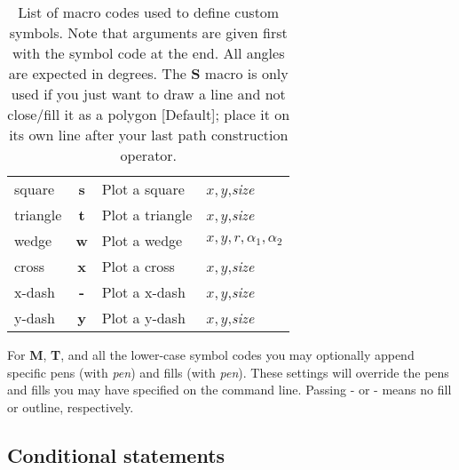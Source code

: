 \begin{table}[H]
\begin{tabular}{lcll}
square		&	\textbf{s}	& Plot a square 			& $x, y$,\emph{size}  \\
triangle	&	\textbf{t}	& Plot a triangle 			& $x, y$,\emph{size}  \\
wedge		&	\textbf{w}	& Plot a wedge 				& $x, y, r, \alpha_1, \alpha_2$  \\
cross		&	\textbf{x}	& Plot a cross 				& $x, y$,\emph{size}  \\
x-dash		&	\textbf{-}	& Plot a x-dash 			& $x, y$,\emph{size}  \\
y-dash		&	\textbf{y}	& Plot a y-dash 			& $x, y$,\emph{size}  \\ \hline
\end{tabular}
\label{tbl:custsymb}
\caption{List of macro codes used to define custom symbols.  Note that arguments are given first with the symbol code at the end.
All angles are expected in degrees. The \textbf{S} macro is only used if you just want to draw a line and not close/fill it as
a polygon [Default]; place it on its own line after your last path construction operator.}
\end{table} 
For \textbf{M}, \textbf{T}, and all the lower-case symbol codes you may optionally append specific pens (with \emph{pen})
and fills (with \emph{pen}).  These settings will override the pens and fills you may have specified
on the command line.  Passing - or - means no fill or outline, respectively.

\subsection{Conditional statements}


